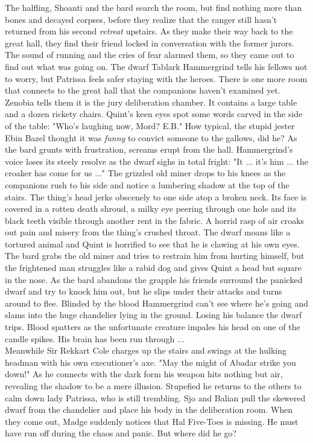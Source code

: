 The halfling, Shoanti and the bard search the room, but find nothing more than bones and decayed corpses, before they realize that the ranger still hasn't returned from his second {\itshape retreat} upstairs. As they make their way back to the great hall, they find their friend locked in conversation with the former jurors. The sound of running and the cries of fear alarmed them, so they came out to find out what was going on. The dwarf Tablark Hammergrind tells his fellows not to worry, but Patrissa feels safer staying with the heroes. There is one more room that connects to the great hall that the companions haven't examined yet. Zenobia tells them it is the jury deliberation chamber. It contains a large table and a dozen rickety chairs. Quint's keen eyes spot some words carved in the side of the table: "Who's laughing now, Mord? E.B." How typical, the stupid jester Ebin Bazel thought it was {\itshape funny} to convict someone to the gallows, did he? As the bard grunts with frustration, screams erupt from the hall. Hammergrind's voice loses its steely resolve as the dwarf sighs in total fright: "It ... it's him ... the croaker has come for us ..." The grizzled old miner drops to his knees as the companions rush to his side and notice a lumbering shadow at the top of the stairs. The thing's head jerks obscenely to one side atop a broken neck. Its face is covered in a rotten death shroud, a milky eye peering through one hole and its black teeth visible through another rent in the fabric. A horrid rasp of air croaks out pain and misery from the thing's crushed throat. The dwarf moans like a tortured animal and Quint is horrified to see that he is clawing at his own eyes. The bard grabs the old miner and tries to restrain him from hurting himself, but the frightened man struggles like a rabid dog and gives Quint a head but square in the nose. As the bard abandons the grapple his friends surround the panicked dwarf and try to knock him out, but he slips under their attacks and turns around to flee. Blinded by the blood Hammergrind can't see where he's going and slams into the huge chandelier lying in the ground. Losing his balance the dwarf trips. Blood spatters as the unfortunate creature impales his head on one of the candle spikes. His brain has been run through ...\\

Meanwhile Sir Rekkart Cole charges up the stairs and swings at the hulking headman with his own executioner's axe. "May the might of Abadar strike you down!" As he connects with the dark form his weapon hits nothing but air, revealing the shadow to be a mere illusion. Stupefied he returns to the others to calm down lady Patrissa, who is still trembling. Sjo and Balian pull the skewered dwarf from the chandelier and place his body in the deliberation room. When they come out, Madge suddenly notices that Hal Five-Toes is missing. He must have run off during the chaos and panic. But where did he go?\\

